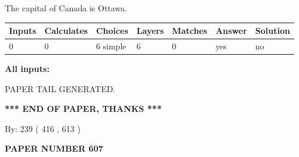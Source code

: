 \documentclass[12pt]{article}
\begin{document}
 
The capital of Canada is Ottawa.
 
 
\noindent{}
 
 
   
   
   
   
\noindent\begin{tabular}{|l|l|l|l|l|l|l|}
 \hline
Inputs & Calculates & Choices & Layers & Matches & Answer & Solution \\ \hline
 0  & 
 0  & 
 6
  simple  
  & 
 6  & 
 0  & 
  yes & 
  no 
  \\ \hline
 \end{tabular}
   
   
   
   
\noindent{}
   
   
   
   
\noindent\vspace{0.1in}\hspace{-0.08in} {\textbf{\Large{All inputs: }}}
   
   
   
   
   
   
 \vspace{0.2in}
 
   
   
\vspace{2.0in} PAPER TAIL GENERATED.
   
   
   
   
\vspace{1.0in} 
{\textbf{\large{ *** END OF PAPER, THANKS *** }}} 
   
   
\hspace{1.0in} By: 
 239 ( 416 ,  613 )
   
   
   
   
\newpage 
\setcounter{page}{ 
   607001 } 
   
   
   
   
 {\textbf{ \Large{ PAPER NUMBER  607  }}}
   
   
\vspace{0.2in}
   
   
   
   
   
   
   
\end{document}
